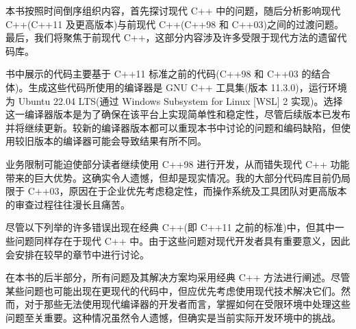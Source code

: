 本书按照时间倒序组织内容，首先探讨现代 C++ 中的问题，随后分析影响现代 C++(C++11 及更高版本)与前现代 C++(C++98 和 C++03)之间的过渡问题。最后，我们将聚焦于前现代 C++，这部分内容涉及许多受限于现代方法的遗留代码库。

书中展示的代码主要基于 C++11 标准之前的代码(C++98 和 C++03 的结合体)。生成这些代码所使用的编译器是 GNU C++ 工具集(版本 11.3.0)，运行环境为 Ubuntu 22.04 LTS(通过 Windows Subsystem for Linux [WSL] 2 实现)。选择这一编译器版本是为了确保在该平台上实现简单性和稳定性，尽管后续版本已发布并将继续更新。较新的编译器版本都可以重现本书中讨论的问题和编码缺陷，但使用较旧版本的编译器可能会导致结果有所不同。

业务限制可能迫使部分读者继续使用 C++98 进行开发，从而错失现代 C++ 功能带来的巨大优势。这确实令人遗憾，但却是现实情况。我的大部分代码库目前仍局限于 C++03，原因在于企业优先考虑稳定性，而操作系统及工具团队对更高版本的审查过程往往漫长且痛苦。

尽管以下列举的许多错误出现在经典 C++(即 C++11 之前的标准)中，但其中一些问题同样存在于现代 C++ 中。由于这些问题对现代开发者具有重要意义，因此会安排在较早的章节中进行讨论。

在本书的后半部分，所有问题及其解决方案均采用经典 C++ 方法进行阐述。尽管某些问题也可能出现在更现代的代码中，但应优先考虑使用现代技术解决它们。然而，对于那些无法使用现代编译器的开发者而言，掌握如何在受限环境中处理这些问题至关重要。这种情况虽然令人遗憾，但确实是当前实际开发环境中的挑战。
